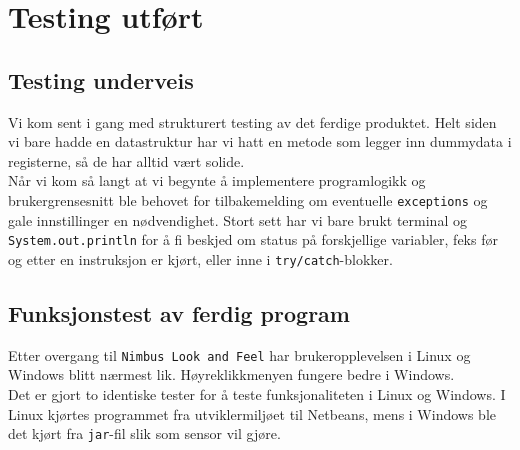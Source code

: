 \section{Testing utført}
\subsection{Testing underveis}
Vi kom sent i gang med strukturert testing av det ferdige produktet. Helt siden vi bare hadde en datastruktur har vi hatt en metode som legger inn dummydata i registerne, så de har alltid vært solide.\\
Når vi kom så langt at vi begynte å implementere programlogikk og brukergrensesnitt ble behovet for tilbakemelding om eventuelle \texttt{exceptions} og gale innstillinger en nødvendighet. 
Stort sett har vi bare brukt terminal og \texttt{System.out.println} for å fi beskjed om status på forskjellige variabler, feks før og etter en instruksjon er kjørt, eller inne i \texttt{try/catch}-blokker.

\subsection{Funksjonstest av ferdig program}
Etter overgang til \texttt{Nimbus Look and Feel} har brukeropplevelsen i Linux og Windows blitt nærmest lik. Høyreklikkmenyen fungere bedre i Windows. \\
Det er gjort to identiske tester for å teste funksjonaliteten i Linux og Windows. I Linux kjørtes programmet fra utviklermiljøet til Netbeans, mens i Windows ble det kjørt fra \texttt{jar}-fil slik som sensor vil gjøre.
